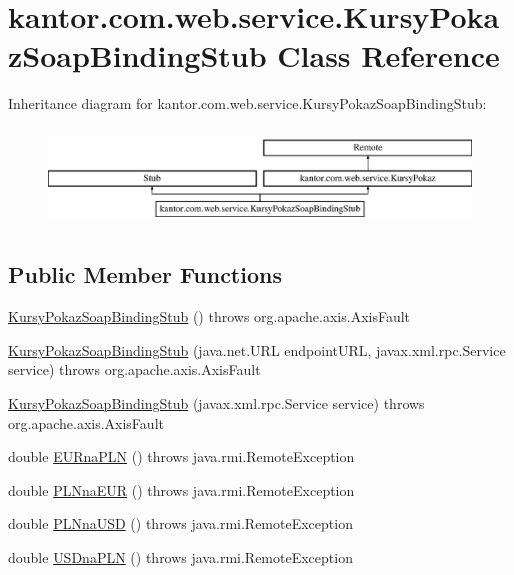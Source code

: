 \hypertarget{classkantor_1_1com_1_1web_1_1service_1_1_kursy_pokaz_soap_binding_stub}{\section{kantor.\+com.\+web.\+service.\+Kursy\+Pokaz\+Soap\+Binding\+Stub Class Reference}
\label{classkantor_1_1com_1_1web_1_1service_1_1_kursy_pokaz_soap_binding_stub}
}
Inheritance diagram for kantor.\+com.\+web.\+service.\+Kursy\+Pokaz\+Soap\+Binding\+Stub\+:\begin{figure}[H]
\begin{center}
\leavevmode
\includegraphics[height=2.608696cm]{classkantor_1_1com_1_1web_1_1service_1_1_kursy_pokaz_soap_binding_stub}
\end{center}
\end{figure}
\subsection*{Public Member Functions}
\begin{DoxyCompactItemize}
\item 
\hyperlink{classkantor_1_1com_1_1web_1_1service_1_1_kursy_pokaz_soap_binding_stub_aec58f518269c22a2c0c006966e07bace}{Kursy\+Pokaz\+Soap\+Binding\+Stub} ()  throws org.\+apache.\+axis.\+Axis\+Fault 
\item 
\hyperlink{classkantor_1_1com_1_1web_1_1service_1_1_kursy_pokaz_soap_binding_stub_a5d6d3b8257a8f09803deb90b3c6b79c0}{Kursy\+Pokaz\+Soap\+Binding\+Stub} (java.\+net.\+U\+R\+L endpoint\+U\+R\+L, javax.\+xml.\+rpc.\+Service service)  throws org.\+apache.\+axis.\+Axis\+Fault 
\item 
\hyperlink{classkantor_1_1com_1_1web_1_1service_1_1_kursy_pokaz_soap_binding_stub_aac01c798f0276a9eb2132a01e5bb1615}{Kursy\+Pokaz\+Soap\+Binding\+Stub} (javax.\+xml.\+rpc.\+Service service)  throws org.\+apache.\+axis.\+Axis\+Fault 
\item 
double \hyperlink{classkantor_1_1com_1_1web_1_1service_1_1_kursy_pokaz_soap_binding_stub_a3e89646ddaed6b605071d1f6d186e66e}{E\+U\+Rna\+P\+L\+N} ()  throws java.\+rmi.\+Remote\+Exception 
\item 
double \hyperlink{classkantor_1_1com_1_1web_1_1service_1_1_kursy_pokaz_soap_binding_stub_a6dd0efcbf660c065637f49570889f41d}{P\+L\+Nna\+E\+U\+R} ()  throws java.\+rmi.\+Remote\+Exception 
\item 
double \hyperlink{classkantor_1_1com_1_1web_1_1service_1_1_kursy_pokaz_soap_binding_stub_a2f975ee29635758cd503316c16ba179c}{P\+L\+Nna\+U\+S\+D} ()  throws java.\+rmi.\+Remote\+Exception 
\item 
double \hyperlink{classkantor_1_1com_1_1web_1_1service_1_1_kursy_pokaz_soap_binding_stub_aa8b296ac90b4ab4c880652527c013db2}{U\+S\+Dna\+P\+L\+N} ()  throws java.\+rmi.\+Remote\+Exception 
\end{DoxyCompactItemize}
